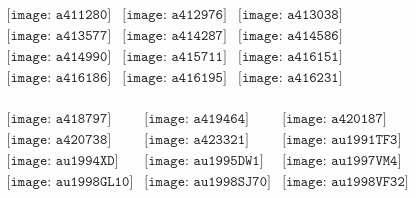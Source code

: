 \documentclass{article}
\begin{document}
\begin{figure}[H]
 \begin{center}$
 \begin{array}{cccc}
\texttt{[image: a411280]}&\texttt{[image: a412976]}&\texttt{[image: a413038]}\\\texttt{[image: a413577]}&\texttt{[image: a414287]}&\texttt{[image: a414586]}\\\texttt{[image: a414990]}&\texttt{[image: a415711]}&\texttt{[image: a416151]}\\\texttt{[image: a416186]}&\texttt{[image: a416195]}&\texttt{[image: a416231]}\\
\end{array}$
\end{center}
\end{figure}

\begin{figure}[H]
 \begin{center}$
 \begin{array}{cccc}
\texttt{[image: a418797]}&\texttt{[image: a419464]}&\texttt{[image: a420187]}\\\texttt{[image: a420738]}&\texttt{[image: a423321]}&\texttt{[image: au1991TF3]}\\\texttt{[image: au1994XD]}&\texttt{[image: au1995DW1]}&\texttt{[image: au1997VM4]}\\\texttt{[image: au1998GL10]}&\texttt{[image: au1998SJ70]}&\texttt{[image: au1998VF32]}\\
\end{array}$
\end{center}
\end{figure}
\end{document}
